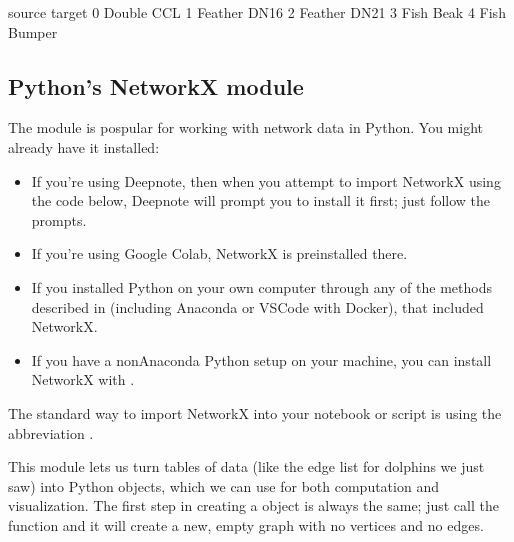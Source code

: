 \documentclass[letterpaper,10pt,english]{jupyterBook}
\begin{document}
\begin{sphinxVerbatim}[commandchars=\\\{\}]
    source  target
0   Double     CCL
1  Feather    DN16
2  Feather    DN21
3     Fish    Beak
4     Fish  Bumper
\end{sphinxVerbatim}


\subsection{Python’s NetworkX module}
\label{\detokenize{chapter-15-networks:python-s-networkx-module}}
\sphinxAtStartPar
The  module is pospular for working with network data in Python.  You might already have it installed:
\begin{itemize}
\item {} 
\sphinxAtStartPar
If you’re using Deepnote, then when you attempt to import NetworkX using the code below, Deepnote will prompt you to install it first; just follow the prompts.

\item {} 
\sphinxAtStartPar
If you’re using Google Colab, NetworkX is pre\sphinxhyphen{}installed there.

\item {} 
\sphinxAtStartPar
If you installed Python on your own computer through any of the methods described in {\hyperref[\detokenize{chapter-3-jupyter::doc}]{}} (including Anaconda or VSCode with Docker), that included NetworkX.

\item {} 
\sphinxAtStartPar
If you have a non\sphinxhyphen{}Anaconda Python setup on your machine, you can install NetworkX with .

\end{itemize}

\sphinxAtStartPar
The standard way to import NetworkX into your notebook or script is using the abbreviation .

\begin{sphinxVerbatim}[commandchars=\\\{\}]
   
\end{sphinxVerbatim}

\sphinxAtStartPar
This module lets us turn tables of data (like the edge list for dolphins we just saw) into Python  objects, which we can use for both computation and visualization.  The first step in creating a  object is always the same; just call the  function and it will create a new, empty graph with no vertices and no edges.
\end{document}
